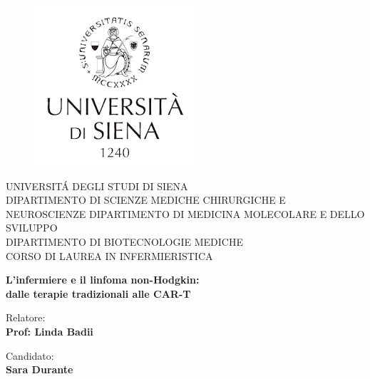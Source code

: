 \begin{titlepage}
\begin{figure}[!htb]
    \centering
    \includegraphics[keepaspectratio=true,scale=0.8]{format/img/unisi.png}
\end{figure}

\begin{center}
    \LARGE{UNIVERSIT\'A DEGLI STUDI DI SIENA}
    \vspace{5mm}
    \\ \large{DIPARTIMENTO DI SCIENZE MEDICHE CHIRURGICHE E NEUROSCIENZE
    DIPARTIMENTO DI MEDICINA MOLECOLARE E DELLO SVILUPPO\\
    DIPARTIMENTO DI BIOTECNOLOGIE MEDICHE}
    \vspace{5mm}
    \\ \LARGE{CORSO DI LAUREA IN INFERMIERISTICA}
\end{center}

\vspace{15mm}
\begin{center}
    {\LARGE{\bf L'infermiere e il linfoma non-Hodgkin:\\ \vspace{5mm} dalle terapie tradizionali alle CAR-T }}
    
    
\end{center}
\vspace{30mm}

\begin{minipage}[t]{0.47\textwidth}
	{\large{Relatore:}{\normalsize\vspace{3mm}
    \bf\\ \large{Prof: Linda Badii} \normalsize\vspace{3mm}\bf}}
\end{minipage}
\hfill
\begin{minipage}[t]{0.47\textwidth}\raggedleft
	{\large{Candidato:}{\normalsize\vspace{3mm} \bf\\ \large{Sara Durante}}}
\end{minipage}

\vspace{30mm}

\end{titlepage}